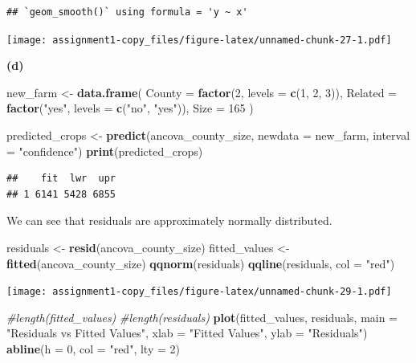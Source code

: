 \documentclass[
]{article}
\newenvironment{Shaded}{\begin{snugshade}}{\end{snugshade}}
\newcommand{\AttributeTok}[1]{\textcolor[rgb]{0.13,0.29,0.53}{#1}}
\newcommand{\CommentTok}[1]{\textcolor[rgb]{0.56,0.35,0.01}{\textit{#1}}}
\newcommand{\DecValTok}[1]{\textcolor[rgb]{0.00,0.00,0.81}{#1}}
\newcommand{\FunctionTok}[1]{\textcolor[rgb]{0.13,0.29,0.53}{\textbf{#1}}}
\newcommand{\NormalTok}[1]{#1}
\newcommand{\OtherTok}[1]{\textcolor[rgb]{0.56,0.35,0.01}{#1}}
\newcommand{\StringTok}[1]{\textcolor[rgb]{0.31,0.60,0.02}{#1}}
\begin{document}
\begin{verbatim}
## `geom_smooth()` using formula = 'y ~ x'
\end{verbatim}

\texttt{[image: assignment1-copy\_files/figure-latex/unnamed-chunk-27-1.pdf]}

\textbf{(d)}

\begin{Shaded}
\begin{Highlighting}[]
\NormalTok{new\_farm }\OtherTok{\textless{}{-}} \FunctionTok{data.frame}\NormalTok{(}
  \AttributeTok{County =} \FunctionTok{factor}\NormalTok{(}\DecValTok{2}\NormalTok{, }\AttributeTok{levels =} \FunctionTok{c}\NormalTok{(}\DecValTok{1}\NormalTok{, }\DecValTok{2}\NormalTok{, }\DecValTok{3}\NormalTok{)), }
  \AttributeTok{Related =} \FunctionTok{factor}\NormalTok{(}\StringTok{"yes"}\NormalTok{, }\AttributeTok{levels =} \FunctionTok{c}\NormalTok{(}\StringTok{"no"}\NormalTok{, }\StringTok{"yes"}\NormalTok{)),}
  \AttributeTok{Size =} \DecValTok{165}  
\NormalTok{)}

\NormalTok{predicted\_crops }\OtherTok{\textless{}{-}} \FunctionTok{predict}\NormalTok{(ancova\_county\_size, }\AttributeTok{newdata =}\NormalTok{ new\_farm, }\AttributeTok{interval =} \StringTok{"confidence"}\NormalTok{)}
\FunctionTok{print}\NormalTok{(predicted\_crops)}
\end{Highlighting}
\end{Shaded}

\begin{verbatim}
##    fit  lwr  upr
## 1 6141 5428 6855
\end{verbatim}

We can see that residuals are approximately normally distributed.

\begin{Shaded}
\begin{Highlighting}[]
\NormalTok{residuals }\OtherTok{\textless{}{-}} \FunctionTok{resid}\NormalTok{(ancova\_county\_size)}
\NormalTok{fitted\_values }\OtherTok{\textless{}{-}} \FunctionTok{fitted}\NormalTok{(ancova\_county\_size) }
\FunctionTok{qqnorm}\NormalTok{(residuals)}
\FunctionTok{qqline}\NormalTok{(residuals, }\AttributeTok{col =} \StringTok{"red"}\NormalTok{)}
\end{Highlighting}
\end{Shaded}

\texttt{[image: assignment1-copy\_files/figure-latex/unnamed-chunk-29-1.pdf]}

\begin{Shaded}
\begin{Highlighting}[]
\CommentTok{\#length(fitted\_values)}
\CommentTok{\#length(residuals)}
\FunctionTok{plot}\NormalTok{(fitted\_values, residuals, }
     \AttributeTok{main =} \StringTok{"Residuals vs Fitted Values"}\NormalTok{, }
     \AttributeTok{xlab =} \StringTok{"Fitted Values"}\NormalTok{, }
     \AttributeTok{ylab =} \StringTok{"Residuals"}\NormalTok{)}
\FunctionTok{abline}\NormalTok{(}\AttributeTok{h =} \DecValTok{0}\NormalTok{, }\AttributeTok{col =} \StringTok{"red"}\NormalTok{, }\AttributeTok{lty =} \DecValTok{2}\NormalTok{)}
\end{Highlighting}
\end{Shaded}
\end{document}
